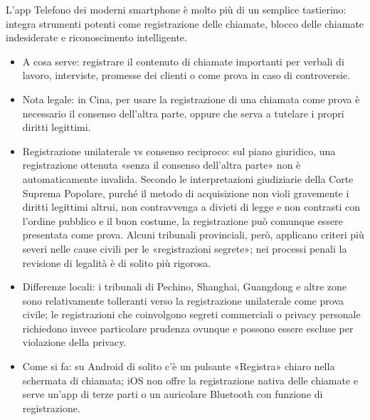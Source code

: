 


L'app Telefono dei moderni smartphone è molto più di un semplice tastierino: integra strumenti potenti come registrazione delle chiamate, blocco delle chiamate indesiderate e riconoscimento intelligente.


\begin{itemize}
  \item A cosa serve: registrare il contenuto di chiamate importanti per verbali di lavoro, interviste, promesse dei clienti o come prova in caso di controversie.
  \item Nota legale: in Cina, per usare la registrazione di una chiamata come prova è necessario il consenso dell'altra parte, oppure che serva a tutelare i propri diritti legittimi.
  \item Registrazione unilaterale vs consenso reciproco: sul piano giuridico, una registrazione ottenuta «senza il consenso dell'altra parte» non è automaticamente invalida. Secondo le interpretazioni giudiziarie della Corte Suprema Popolare, purché il metodo di acquisizione non violi gravemente i diritti legittimi altrui, non contravvenga a divieti di legge e non contrasti con l'ordine pubblico e il buon costume, la registrazione può comunque essere presentata come prova. Alcuni tribunali provinciali, però, applicano criteri più severi nelle cause civili per le «registrazioni segrete»; nei processi penali la revisione di legalità è di solito più rigorosa.
  \item Differenze locali: i tribunali di Pechino, Shanghai, Guangdong e altre zone sono relativamente tolleranti verso la registrazione unilaterale come prova civile; le registrazioni che coinvolgono segreti commerciali o privacy personale richiedono invece particolare prudenza ovunque e possono essere escluse per violazione della privacy.
  \item Come si fa: su Android di solito c'è un pulsante «Registra» chiaro nella schermata di chiamata; iOS non offre la registrazione nativa delle chiamate e serve un'app di terze parti o un auricolare Bluetooth con funzione di registrazione.
\end{itemize}

